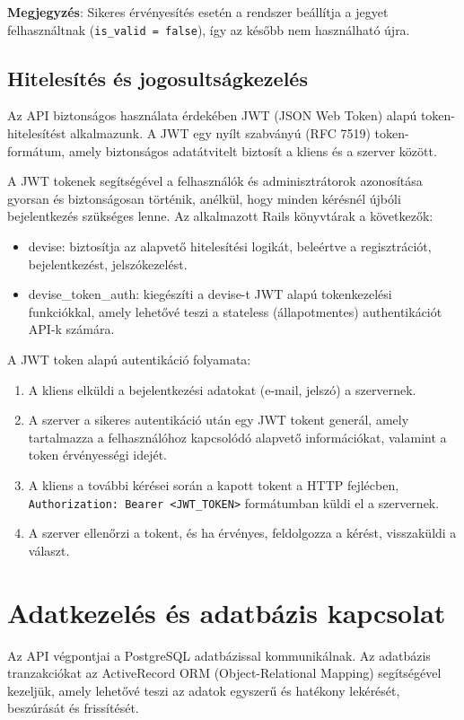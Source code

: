 \textbf{Megjegyzés}:
Sikeres érvényesítés esetén a rendszer beállítja a jegyet felhasználtnak (\texttt{is\_valid = false}), így az később nem használható újra.


\subsection{Hitelesítés és jogosultságkezelés}

Az API biztonságos használata érdekében JWT (JSON Web Token) alapú token-hitelesítést alkalmazunk. A JWT egy nyílt szabványú (RFC 7519) token-formátum, amely biztonságos adatátvitelt biztosít a kliens és a szerver között. 

A JWT tokenek segítségével a felhasználók és adminisztrátorok azonosítása gyorsan és biztonságosan történik, anélkül, hogy minden kérésnél újbóli bejelentkezés szükséges lenne. Az alkalmazott Rails könyvtárak a következők:

\begin{itemize}
    \item devise: biztosítja az alapvető hitelesítési logikát, beleértve a regisztrációt, bejelentkezést, jelszókezelést.
    \item devise\_token\_auth: kiegészíti a devise-t JWT alapú tokenkezelési funkciókkal, amely lehetővé teszi a stateless (állapotmentes) authentikációt API-k számára.
\end{itemize}

A JWT token alapú autentikáció folyamata:

\begin{enumerate}
    \item A kliens elküldi a bejelentkezési adatokat (e-mail, jelszó) a szervernek.
    \item A szerver a sikeres autentikáció után egy JWT tokent generál, amely tartalmazza a felhasználóhoz kapcsolódó alapvető információkat, valamint a token érvényességi idejét.
    \item A kliens a további kérései során a kapott tokent a HTTP fejlécben, \texttt{Authorization: Bearer <JWT\_TOKEN>} formátumban küldi el a szervernek.
    \item A szerver ellenőrzi a tokent, és ha érvényes, feldolgozza a kérést, visszaküldi a választ.
\end{enumerate}

\section{Adatkezelés és adatbázis kapcsolat}
Az API végpontjai a PostgreSQL adatbázissal kommunikálnak. Az adatbázis tranzakciókat az ActiveRecord ORM (Object-Relational Mapping) segítségével kezeljük, amely lehetővé teszi az adatok egyszerű és hatékony lekérését, beszúrását és frissítését.

